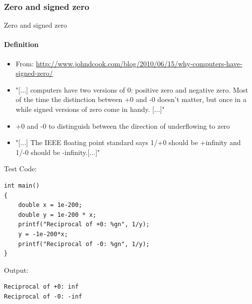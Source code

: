 \documentclass[9pt,pdftex]{beamer}
\begin{document}
\subsubsection{Zero and signed zero}
\begin{frame}[fragile]{Zero and signed zero}
\framesubtitle{Definition}
\begin{itemize}
\item From: \url{http://www.johndcook.com/blog/2010/06/15/why-computers-have-signed-zero/}
\item[] "[...] computers have two versions of 0: positive zero and negative zero. Most of the time the distinction between +0 and -0 doesn’t matter, but once in a while signed versions of zero come in handy. [...]"
\item +0 and -0 to distinguish between the direction of underflowing to zero
\item[] "[...] The IEEE floating point standard says 1/+0 should be +infinity and 1/-0 should be -infinity.[...]"
\end{itemize}
\begin{mdframed}
\begin{minipage}[h]{0.4\textwidth}
Test Code:
\scriptsize{
\begin{lstlisting}
int main()
{
    double x = 1e-200;
    double y = 1e-200 * x;
    printf("Reciprocal of +0: %gn", 1/y);
    y = -1e-200*x;
    printf("Reciprocal of -0: %gn", 1/y);
}
\end{lstlisting}
}
\end{minipage}
\hspace{1.3cm}
\begin{minipage}[b]{0.4\textwidth}
Output:
\begin{lstlisting}
Reciprocal of +0: inf
Reciprocal of -0: -inf
\end{lstlisting}
\end{minipage}
\end{mdframed}
\end{frame}
\end{document}
